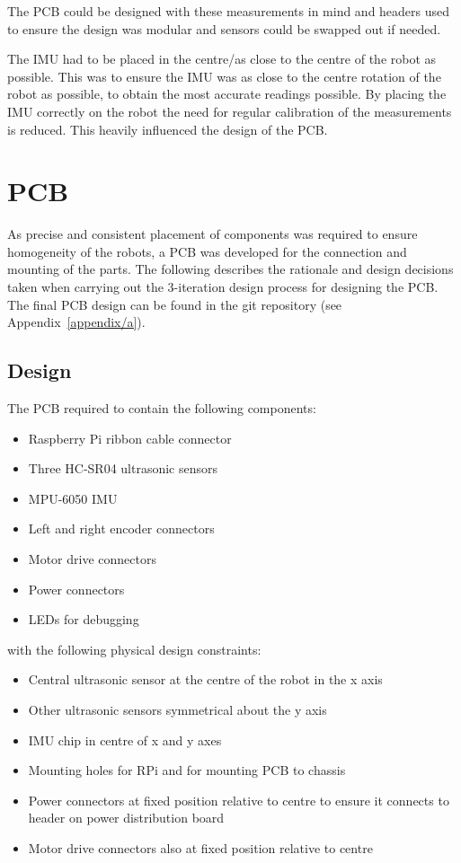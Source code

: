 The PCB could be designed with these measurements
in mind and headers used to ensure the design
was modular and sensors could be swapped out if needed.

The IMU had to be placed in the centre/as
close to the centre of the robot as possible. This was to ensure the
IMU was as close to the centre rotation of the robot as possible, to
obtain the most accurate readings possible. By placing the IMU correctly
on the robot the need for regular calibration of the measurements is
reduced. This heavily influenced the design of the PCB.


\section{PCB}\label{elec/pcb}
As precise and consistent placement of components was required to ensure
homogeneity of the robots, a PCB was developed for the connection
and mounting of the parts. The following
describes the rationale and design decisions taken when carrying out the
3-iteration design process for designing the PCB. The final PCB design can
be found in the git repository (see Appendix~\ref{appendix/a}).

\subsection{Design}\label{elec/pcb/design}
The PCB required to contain the following components:
\begin{itemize}
  \item Raspberry Pi ribbon cable connector
  \item Three HC-SR04 ultrasonic sensors
  \item MPU-6050 IMU
  \item Left and right encoder connectors
  \item Motor drive connectors
  \item Power connectors
  \item LEDs for debugging
\end{itemize}

with the following physical design constraints:

\begin{itemize}
  \item Central ultrasonic sensor at the centre of the robot in the x axis
  \item Other ultrasonic sensors symmetrical about the y axis
  \item IMU chip in centre of x and y axes
  \item Mounting holes for RPi and for mounting PCB to chassis
  \item Power connectors at fixed position relative to centre to ensure it
  connects to header on power distribution board
  \item Motor drive connectors also at fixed position relative to centre
\end{itemize}

